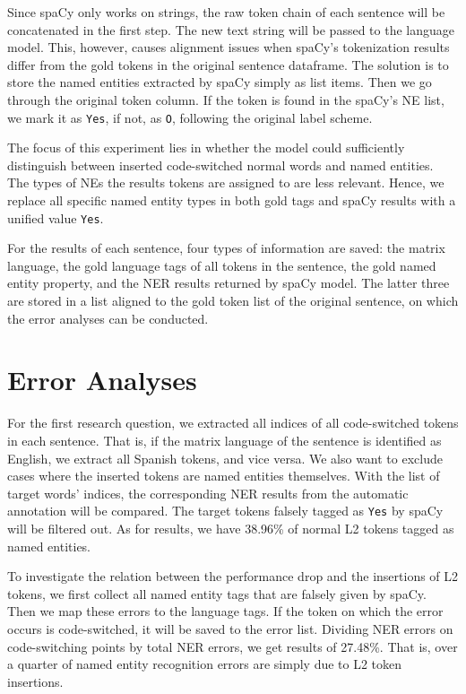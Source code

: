 \documentclass[11pt]{article}
\begin{document}
Since spaCy only works on strings, the raw token chain of each sentence will be concatenated in the first step. The new text string will be passed to the language model. This, however, causes alignment issues when spaCy's tokenization results differ from the gold tokens in the original sentence dataframe. The solution is to store the named entities extracted by spaCy simply as list items. Then we go through the original token column. If the token is found in the spaCy's NE list, we mark it as \texttt{Yes}, if not, as \texttt{O}, following the original label scheme.

The focus of this experiment lies in whether the model could sufficiently distinguish between inserted code-switched normal words and named entities. The types of NEs the results tokens are assigned to are less relevant. Hence, we replace all specific named entity types in both gold tags and spaCy results with a unified value \texttt{Yes}. 

For the results of each sentence, four types of information are saved: the matrix language, the gold language tags of all tokens in the sentence, the gold named entity property, and the NER results returned by spaCy model. The latter three are stored in a list aligned to the gold token list of the original sentence, on which the error analyses can be conducted.


\section{Error Analyses}

For the first research question, we extracted all indices of all code-switched tokens in each sentence. That is, if the matrix language of the sentence is identified as English, we extract all Spanish tokens, and vice versa. We also want to exclude cases where the inserted tokens are named entities themselves. With the list of target words' indices, the corresponding NER results from the automatic annotation will be compared. The target tokens falsely tagged as \texttt{Yes} by spaCy will be filtered out. As for results, we have 38.96\% of normal L2 tokens tagged as named entities.

To investigate the relation between the performance drop and the insertions of L2 tokens, we first collect all named entity tags that are falsely given by spaCy. Then we map these errors to the language tags. If the token on which the error occurs is code-switched, it will be saved to the error list. Dividing NER errors on code-switching points by total NER errors, we get results of 27.48\%. That is, over a quarter of named entity recognition errors are simply due to L2 token insertions.
\end{document}
